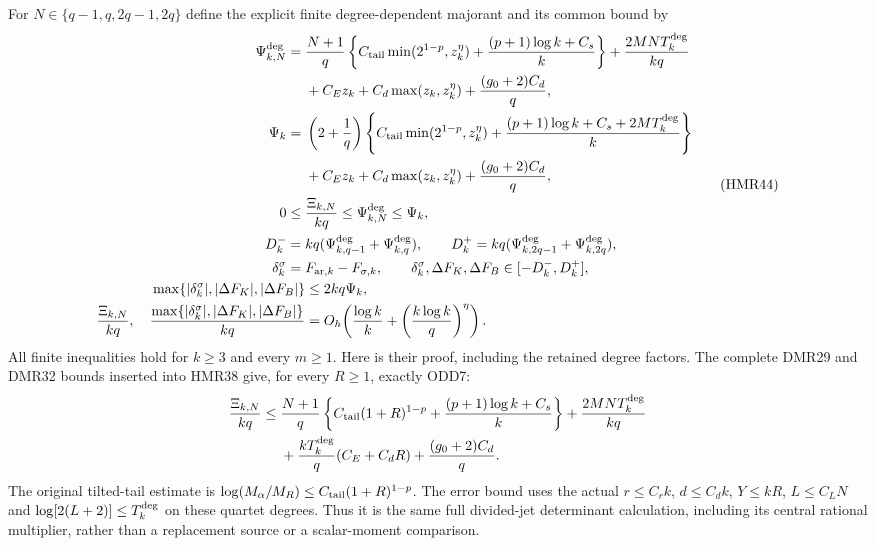 For $N\in\{q-1,q,2q-1,2q\}$ define the explicit finite
degree-dependent majorant and its common bound by
\[
\begin{aligned}
 \Psi_{k,N}^{\rm deg}={}&\frac{N+1}{q}
 \left\{C_{\rm tail}\min(2^{1-p},z_k^\eta)
       +\frac{(p+1)\log k+C_s}{k}\right\}
       +\frac{2MN T_k^{\rm deg}}{kq}\\
 &+C_Ez_k+C_d\max(z_k,z_k^\eta)
                     +\frac{(g_0+2)C_d}{q},\\
 \Psi_k={}&\left(2+\frac1q\right)
 \left\{C_{\rm tail}\min(2^{1-p},z_k^\eta)
       +\frac{(p+1)\log k+C_s+2MT_k^{\rm deg}}{k}\right\}\\
 &+C_Ez_k+C_d\max(z_k,z_k^\eta)
                     +\frac{(g_0+2)C_d}{q},\\
 0\leq{}&\frac{\Xi_{k,N}}{kq}
        \leq\Psi_{k,N}^{\rm deg}\leq\Psi_k,\\
 D_k^-={}&kq(\Psi_{k,q-1}^{\rm deg}+\Psi_{k,q}^{\rm deg}),\qquad
 D_k^+=kq(\Psi_{k,2q-1}^{\rm deg}+\Psi_{k,2q}^{\rm deg}),\\
 \delta_k^\sigma={}&F_{\mathrm{ar},k}-F_{\sigma,k},\qquad
 \delta_k^\sigma,\Delta F_K,\Delta F_B\in[-D_k^-,D_k^+],\\
 \max\{|\delta_k^\sigma|,|\Delta F_K|,|\Delta F_B|\}
 &\leq2kq\Psi_k,\\
 \frac{\Xi_{k,N}}{kq},\quad
 \frac{\max\{|\delta_k^\sigma|,|\Delta F_K|,|\Delta F_B|\}}{kq}
 & =O_h\!\left(\frac{\log k}{k}
                 +\left(\frac{k\log k}{q}\right)^\eta\right).
\end{aligned}\tag{HMR44}
\]
All finite inequalities hold for $k\geq3$ and every $m\geq1$.
Here is their proof, including the retained degree factors.
The complete DMR29 and DMR32 bounds inserted into HMR38 give,
for every $R\geq1$, exactly ODD7:
\[
\begin{aligned}
 \frac{\Xi_{k,N}}{kq}\leq{}&\frac{N+1}{q}
 \left\{C_{\rm tail}(1+R)^{1-p}
                 +\frac{(p+1)\log k+C_s}{k}\right\}
            +\frac{2MN T_k^{\rm deg}}{kq}\\
 &+\frac{kT_k^{\rm deg}}q(C_E+C_dR)
                     +\frac{(g_0+2)C_d}{q}.
\end{aligned}
\]
The original tilted-tail estimate is
$\log(M_\alpha/M_R)\leq C_{\rm tail}(1+R)^{1-p}$.
The error bound uses the actual $r\leq C_rk$,
$d\leq C_dk$, $Y\leq kR$, $L\leq C_LN$ and
$\log[2(L+2)]\leq T_k^{\rm deg}$ on these quartet degrees.
Thus it is the same full divided-jet determinant calculation,
including its central rational multiplier, rather than a
replacement source or a scalar-moment comparison.
